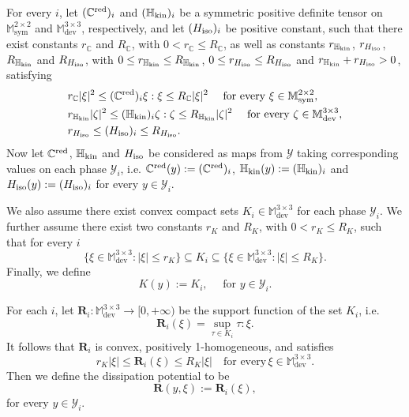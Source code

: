\documentclass[reqno,10pt]{amsart}
\numberwithin{equation}{section}
\theoremstyle{remark}
\newcommand{\C}{\mathbb{C}}
\newcommand{\M}{\mathbb{M}}
\newcommand{\calY}{\mathcal{Y}}
\DeclareMathOperator{\dev}{dev}
\DeclareMathOperator{\sym}{sym}
\newcommand{\Hkin}{\mathbb{H}_{\rm kin}}
\newcommand{\Hiso}{H_{\rm iso}}
\newcommand{\disspot}{\mathbf{R}}
\newcommand{\red}[1]{#1^{\rm red}}
\begin{document}
For every $i$, let $(\red{\C})_i$ and $(\Hkin)_i$ be a symmetric positive definite tensor on $\M^{2 \times 2}_{\sym}$ and $\M^{3 \times 3}_{\dev}$, respectively, and let $(\Hiso)_i$ be positive constant, such that there exist 
constants $r_{\C}$ and $R_{\C}$, with $0 < r_{\C} \leq R_{\C}$, 
as well as constants $r_{\Hkin}$, $r_{\Hiso}$, $R_{\Hkin}$ and $R_{\Hiso}$, with $0 \leq r_{\Hkin} \leq R_{\Hkin}$, $0 \leq r_{\Hiso} \leq R_{\Hiso}$ and $r_{\Hkin} + r_{\Hiso} > 0$,
satisfying
\begin{align} 
	& r_{\C} |\xi|^2 \leq (\red{\C})_i \xi : \xi \leq R_{\C} |\xi|^2 \quad \text{ for every }\xi \in \M^{2 \times 2}_{\sym}, \label{tensorassumption1}
	\\ & r_{\Hkin} |\zeta|^2 \leq (\Hkin)_i \zeta : \zeta \leq R_{\Hkin} |\zeta|^2 \quad \text{ for every }\zeta \in \M^{3 \times 3}_{\dev}, \label{tensorassumption2}
	\\ & r_{\Hiso} \leq (\Hiso)_i \leq R_{\Hiso}. \label{tensorassumption3}
\end{align}
Now let $\red{\C}$, $\Hkin$ and $\Hiso$ be considered as maps from $\calY$ taking corresponding values on each phase $\calY_i$,
i.e. $\red{\C}(y) := (\red{\C})_i$, $\Hkin(y) := (\Hkin)_i$ and $\Hiso(y) := (\Hiso)_i$ for every $y \in \calY_i$.

\medskip

We also assume there exist convex compact sets $K_i \in \M^{3 \times 3}_{\dev}$ for each phase $\calY_i$.
We further assume there exist two constants $r_K$ and $R_K$, with $0 < r_K \leq R_K$, such that for every $i$
\begin{equation*}
	\{ \xi \in \M^{3 \times 3}_{\dev} : |\xi| \leq r_K \} \subseteq K_i \subseteq\{ \xi \in \M^{3 \times 3}_{\dev}: |\xi| \leq R_K \}.
\end{equation*}
Finally, we define
\begin{equation*}
	K(y) := K_i, \quad \text{ for } y \in \calY_i.
\end{equation*}

For each $i$, let $\disspot_i : \M^{3 \times 3}_{\dev} \to [0,+\infty)$ be the support function of the set $K_i$, i.e.
\begin{equation*}
	\disspot_i(\xi) = \sup\limits_{\tau \in K_i} \tau : \xi.
\end{equation*}
It follows that $\disspot_i$ is convex, positively 1-homogeneous, and satisfies
\begin{equation} \label{coercivity of R_i}
	r_K |\xi| \leq \disspot_i(\xi) \leq R_K |\xi| \quad \text{for every}\, \xi \in \M^{3 \times 3}_{\dev}.
\end{equation}
Then we define the dissipation potential to be
\begin{equation*}
	\disspot(y, \xi) := \disspot_i(\xi),
\end{equation*}
for every $y \in \calY_i$.
\end{document}
